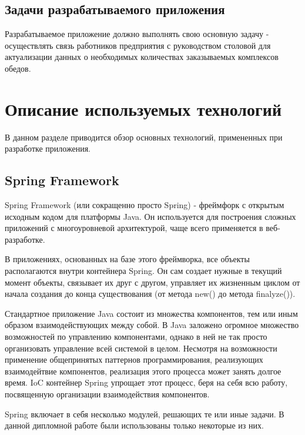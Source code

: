 \documentclass[a4paper]{article}
\begin{document}
\subsection{Задачи разрабатываемого приложения}
Разрабатываемое приложение должно выполнять свою основную задачу - осуществлять связь работников предприятия с руководством столовой для актуализации данных о необходимых количествах заказываемых комплексов обедов.

\section{Описание используемых технологий} 
В данном разделе приводится обзор основных технологий, примененных при разработке приложения.

\subsection{Spring Framework}
Spring Framework (или сокращенно просто Spring) - фреймфорк с открытым исходным кодом для платформы Java. Он используется для построения сложных приложений с многоуровневой архитектурой, чаще всего применяется в веб-разработке.

В приложениях, основанных на базе этого фреймворка, все объекты располагаются внутри контейнера Spring. Он сам создает нужные в текущий момент объекты, связывает их друг с другом, управляет их жизненным циклом от начала создания до конца существования (от метода new() до метода finalyze()).

Стандартное приложение Java состоит из множества компонентов, тем или иным образом взаимодействующих между собой. В Java заложено огромное множество возможностей по управлению компонентами, однако в ней не так просто организовать управление всей системой в целом. Несмотря на возможности применение общепринятых паттернов программирования, реализующих взаимодейтвие компонентов, реализация этого процесса может занять долгое время. IoC контейнер Spring упрощает этот процесс, беря на себя всю работу, посвященную организации взаимодействия компонентов.

Spring включает в себя несколько модулей, решающих те или иные задачи. В данной дипломной работе были использованы только некоторые из них.
\end{document}
